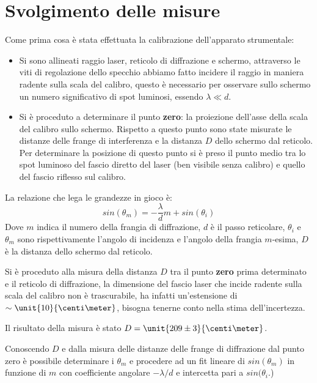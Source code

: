 \section{Svolgimento delle misure}
Come prima cosa è stata effettuata la calibrazione dell'apparato 
strumentale:
\begin{itemize}
	\item Si sono allineati raggio laser, reticolo di diffrazione e schermo, attraverso le viti di regolazione dello specchio abbiamo fatto incidere il raggio in maniera radente sulla scala del calibro, questo è necessario per osservare sullo schermo un numero significativo di spot luminosi, essendo $\lambda \ll d$.
	\item Si è proceduto a determinare il punto \textbf{zero}: la proiezione dell'asse della scala del calibro sullo schermo. Rispetto a questo punto sono state misurate le distanze delle frange di interferenza e la distanza $D$ dello schermo dal reticolo. Per determinare la posizione di questo punto si è preso il punto medio tra lo spot luminoso del fascio diretto del laser (ben visibile senza calibro) e quello del fascio riflesso sul calibro.
\end{itemize}
La relazione che lega le grandezze in gioco è:
$$ sin (\theta_m) =-\frac{\lambda}{d}m+sin (\theta_i)$$
Dove $m$ indica il numero della frangia di diffrazione, $d$ è il passo reticolare, $\theta_i$ e $\theta_m$ sono rispettivamente l'angolo di incidenza e l'angolo della frangia $m$-esima, $D$ è la distanza dello schermo dal reticolo.

Si è proceduto alla misura della distanza $D$ tra il punto \textbf{zero} prima determinato e il reticolo di diffrazione, la dimensione del fascio laser che incide radente sulla scala del calibro non è trascurabile, ha infatti un'estensione di $\sim \unit{10}{\centi\meter}$, bisogna tenerne conto nella stima dell'incertezza.

Il risultato della misura è stato $D = \unit{209 \pm 3}{\centi\meter}$.

Conoscendo $D$ e dalla misura delle distanze delle frange di diffrazione dal punto zero è possibile determinare i $\theta_m$ e procedere ad un fit lineare di $sin(\theta_m)$ in funzione di $m$ con coefficiente angolare $-\lambda/d$ e intercetta pari a $sin(\theta_i$.)

